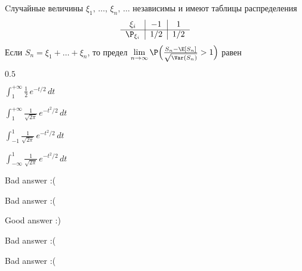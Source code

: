 
\begin{question}
Cлучайные величины \(\xi_1, \, \ldots, \, \xi_n, \, \ldots\) независимы
и имеют таблицы распределения \[
\begin{tabular}{c|c|c}
$\xi_i$                     & $-1$   & $1$   \\ \cline{1-3}
$\P_{\xi_i}$        & $1/2$       & $1/2$   \\
\end{tabular}
\] Если \(S_n = \xi_1 + \ldots + \xi_n\), то предел
\(\lim\limits_{n \rightarrow \infty}\P\Bigl(\frac{S_n - \E[S_n]}{\sqrt{\Var(S_n)}} > 1\Bigr)\)
равен
\begin{answerlist}
  \item \(0.5\)
  \item \(\int_{1}^{+\infty}\frac{1}{2}\,e^{-t/2}\,dt\)
  \item \(\int_{1}^{+\infty}\frac{1}{\sqrt{2\pi}}\,e^{-t^2/2}\,dt\)
  \item \(\int_{-1}^{1}\frac{1}{\sqrt{2\pi}}\,e^{-t^2/2}\,dt\)
  \item \(\int_{-\infty}^{1}\frac{1}{\sqrt{2\pi}}\,e^{-t^2/2}\,dt\)
\end{answerlist}
\end{question}

\begin{solution}
\begin{answerlist}
  \item Bad answer :(
  \item Bad answer :(
  \item Good answer :)
  \item Bad answer :(
  \item Bad answer :(
\end{answerlist}
\end{solution}

